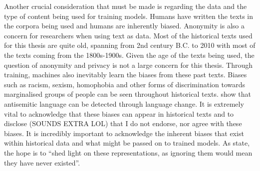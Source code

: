 Another crucial consideration that must be made is regarding the data and the type of content being used for training models. Humans have written the texts in the corpora being used and humans are inherently biased. Anonymity is also a concern for researchers when using text as data. Most of the historical texts used for this thesis are quite old, spanning from 2nd century B.C. to 2010 with most of the texts coming from the 1800s-1900s. Given the age of the texts being used, the question of anonymity and privacy is not a large concern for this thesis. Through training, machines also inevitably learn the biases from these past texts. Biases such as racism, sexism, homophobia and other forms of discrimination towards marginalised groups of people can be seen throughout historical texts. \citet{tripodi-etal-2019-tracing} show that antisemitic language can be detected through language change. It is extremely vital to acknowledge that these biases can appear in historical texts and to disclose (SOUNDS EXTRA LOL) that I do not endorse, nor agree with these biases. It is incredibly important to acknowledge the inherent biases that exist within historical data and what might be passed on to trained models. As \citet{hengchen-tahmasebi_2021-swedishdiachronic} state, the hope is to “shed light on these representations, as ignoring them would mean they have never existed”. 
